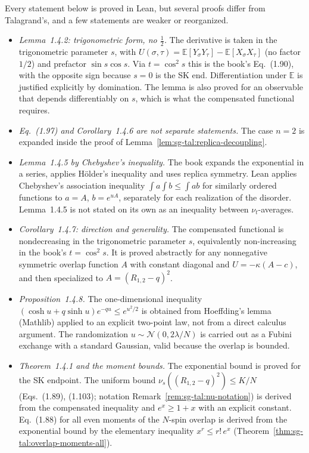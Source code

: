 \begin{remark}\label{rem:sg-tal:dev-14}
Every statement below is proved in Lean, but several proofs differ from Talagrand's, and a few statements are weaker or reorganized.
\begin{itemize}
\item \emph{Lemma~1.4.2: trigonometric form, no $\tfrac12$.} The derivative is taken in the trigonometric parameter $s$, with $U(\sigma,\tau)=\mathbb{E}[Y_\sigma Y_\tau]-\mathbb{E}[X_\sigma X_\tau]$ (no factor $1/2$) and prefactor $\sin s\cos s$. Via $t=\cos^2 s$ this is the book's Eq.~(1.90), with the opposite sign because $s=0$ is the SK end. Differentiation under $\mathbb{E}$ is justified explicitly by domination. The lemma is also proved for an observable that depends differentiably on $s$, which is what the compensated functional requires.
\item \emph{Eq.~(1.97) and Corollary~1.4.6 are not separate statements.} The case $n=2$ is expanded inside the proof of Lemma~\ref{lem:sg-tal:replica-decoupling}.
\item \emph{Lemma~1.4.5 by Chebyshev's inequality.} The book expands the exponential in a series, applies H\"older's inequality and uses replica symmetry. Lean applies Chebyshev's association inequality $\int a\int b\le\int ab$ for similarly ordered functions to $a=A$, $b=e^{uA}$, separately for each realization of the disorder. Lemma~1.4.5 is not stated on its own as an inequality between $\nu_t$-averages.
\item \emph{Corollary~1.4.7: direction and generality.} The compensated functional is nondecreasing in the trigonometric parameter $s$, equivalently non-increasing in the book's $t=\cos^2 s$. It is proved abstractly for any nonnegative symmetric overlap function $A$ with constant diagonal and $U=-\kappa(A-c)$, and then specialized to $A=(R_{1,2}-q)^2$.
\item \emph{Proposition~1.4.8.} The one-dimensional inequality $(\cosh u+q\sinh u)e^{-qu}\le e^{u^2/2}$ is obtained from Hoeffding's lemma (Mathlib) applied to an explicit two-point law, not from a direct calculus argument. The randomization $u\sim\mathcal N(0,2\lambda/N)$ is carried out as a Fubini exchange with a standard Gaussian, valid because the overlap is bounded.
\item \emph{Theorem~1.4.1 and the moment bounds.} The exponential bound is proved for the SK endpoint. The uniform bound $\nu_s((R_{1,2}-q)^2)\le K/N$ (Eqs.~(1.89), (1.103); notation Remark~\ref{rem:sg-tal:nu-notation}) is derived from the compensated inequality and $e^x\ge1+x$ with an explicit constant. Eq.~(1.88) for all even moments of the $N$-spin overlap is derived from the exponential bound by the elementary inequality $x^r\le r!\,e^x$ (Theorem~\ref{thm:sg-tal:overlap-moments-all}).

\end{itemize}
\end{remark}

